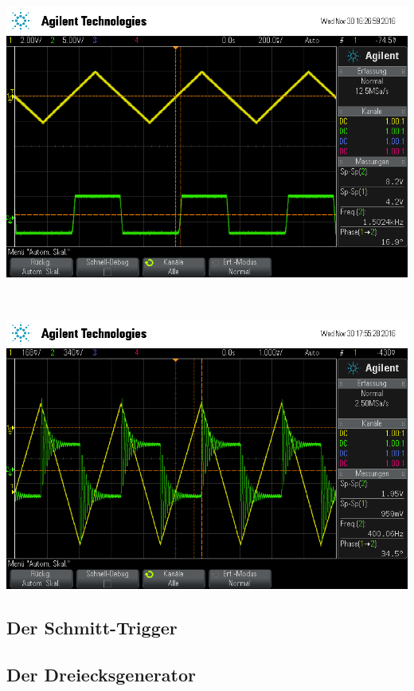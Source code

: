 \documentclass[]{scrartcl}
\begin{document}
\begin{minipage}[t]{0.5\textwidth}
	\includegraphics[width=\textwidth]{images/rechteck_diff}
	\label{fig:rechteckdiff}
\end{minipage} \\
\begin{minipage}[t]{0.5\textwidth}
	\includegraphics[width=\textwidth]{images/dreieck_diff}
	\label{fig:dreieckdiff}
\end{minipage} 

\subsection{Der Schmitt-Trigger}

\subsection{Der Dreiecksgenerator}
\end{document}
